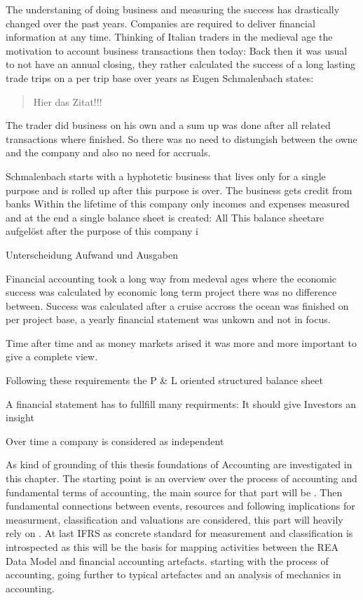 The understaning of doing business and measuring the success has drastically changed over the past years.
Companies are required to deliver financial information at any time.
Thinking of Italian traders in the medieval age the motivation to account business transactions then today:
Back then it was usual to not have an annual closing, they rather calculated the success of a long lasting trade trips on a per trip base over years as Eugen Schmalenbach states:

\blockquote[\cite{schmalenbach1962}][]{Hier das Zitat!!!}

The trader did business on his own and a sum up was done after all related transactions where finished.
So there was no need to distungish between the owne and the company and also no need for accruals.

Schmalenbach starts with a hyphotetic business that lives only for a single purpose and is rolled up after this purpose is over.
The business gets credit from banks 
Within the lifetime of this company only incomes and expenses measured and at the end a single balance sheet is created:
All 
This balance sheetare aufgelöst after the purpose of this company i

Unterscheidung Aufwand und Ausgaben


Financial accounting took a long way from medeval ages where the economic success was calculated by economic long term project there was no difference between. Success was calculated after a cruise accross the ocean was finished on per project base, a yearly financial statement was unkown and not in focus.

Time after time and as money markets arised it was more and more important to give a complete view.


Following these requirements the P \& L oriented structured balance sheet 

A financial statement has to fullfill many requirments: It should give Investors an insight

Over time a company is considered as independent 










As kind of grounding of this thesis foundations of Accounting are investigated in this chapter.
The starting point is an overview over the process of accounting and fundamental terms of accounting, the main source for that part will be \cite{Horngren1984}.
Then fundamental connections between events, resources and following implications for measurment, classification and valuations are considered, this part will heavily rely on \cite{Ijiri1967}.
At last IFRS as concrete standard for measurement and classification is introspected as this will be the basis for mapping activities between the REA Data Model and financial accounting artefacts.
starting with the process of accounting, going further to typical artefactes and an analysis of mechanics in accounting.

